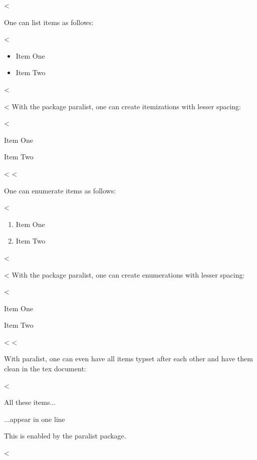 <%

One can list items as follows:

<%
\begin{itemize}
\item Item One
\item Item Two
\end{itemize}
<%

<%
With the package paralist, one can create itemizations with lesser spacing:

<%
\begin{compactitem}
\item Item One
\item Item Two
\end{compactitem}
<%
<%

One can enumerate items as follows:

<%
\begin{enumerate}
\item Item One
\item Item Two
\end{enumerate}
<%

<%
With the package paralist, one can create enumerations with lesser spacing:

<%
\begin{compactenum}
\item Item One
\item Item Two
\end{compactenum}
<%
<%

With paralist, one can even have all items typset after each other and have them clean in the tex document:

<%
\begin{inparaenum}
\item All these items...
\item ...appear in one line
\item This is enabled by the paralist package.
\end{inparaenum}
<%
